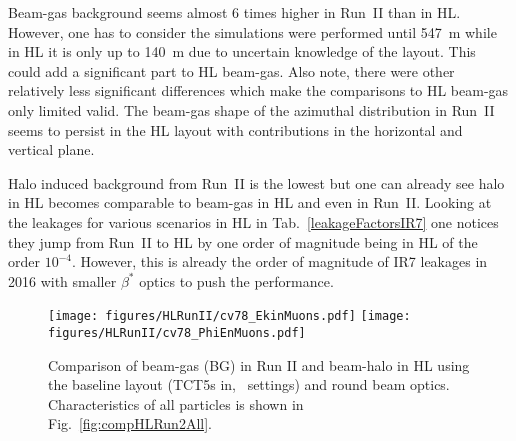 Beam-gas background seems almost 6 times higher in Run~II than in HL. However, one has to consider the simulations were performed until 547~m while in HL it is only up to 140~m due to uncertain knowledge of the layout. This could add a significant part to HL beam-gas. Also note, there were other relatively less significant differences which make the comparisons to HL beam-gas only limited valid. The beam-gas shape of the azimuthal distribution in Run~II seems to persist in the HL layout with contributions in the horizontal and vertical plane.


Halo induced background from Run~II is the lowest but one can already see halo in HL becomes comparable to beam-gas in HL and even in Run~II. Looking at the leakages for various scenarios in HL in Tab.~\ref{leakageFactorsIR7} one notices they jump from Run~II to HL by one order of magnitude being in HL of the order $10^{-4}$. However, this is already the order of magnitude of IR7 leakages in 2016 with smaller $\beta^*$ optics to push the performance.


\begin{figure}
\begin{center}
  \texttt{[image: figures/HLRunII/cv78\_EkinMuons.pdf]}
  \texttt{[image: figures/HLRunII/cv78\_PhiEnMuons.pdf]}
\end{center}
\vspace{-0.6cm}
 \caption{Comparison of beam-gas (BG) in Run II and beam-halo in HL using the baseline layout (TCT5s in, \twosigmaret~settings) and round beam optics. Characteristics of all particles is shown in Fig.~\ref{fig:compHLRun2All}.
  \label{fig:HLR2Muons}}
\end{figure}
